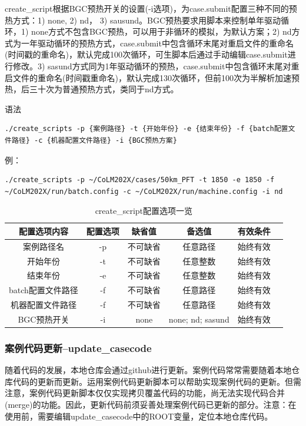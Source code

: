 \documentclass[a4paper,12pt,twoside]{article}
\begin{document}
create\_script根据BGC预热开关的设置(-i选项)，为case.submit配置三种不同的预热方式：1) none, 2) nd， 3) sausund。BGC预热要求用脚本来控制单年驱动循环，1) none方式不包含BGC预热，可以用于非循环的模拟，为默认方案；2) nd方式为一年驱动循环的预热方式，case.submit中包含循环末尾对重启文件的重命名(时间戳的重命名)，默认完成100次循环，可生脚本后通过手动编辑case.submit进行修改。3) sasund方式同为1年驱动循环的预热，case.submit中包含循环末尾对重启文件的重命名(时间戳重命名)，默认完成130次循环，但前100次为半解析加速预热，后三十次为普通预热方式，类同于nd方式。

语法
\begin{lstlisting}
./create_scripts -p {案例路径} -t {开始年份} -e {结束年份} -f {batch配置文件路径} -c {机器配置文件路径} -i {BGC预热方案}
\end{lstlisting}

例：
\begin{lstlisting}
./create_scripts -p ~/CoLM202X/cases/50km_PFT -t 1850 -e 1850 -f ~/CoLM202X/run/batch.config -c ~/CoLM202X/run/machine.config -i nd
\end{lstlisting}

\begin{table}[!htbp]
\renewcommand{\arraystretch}{1.5}
\centering 
\caption{create\_script配置选项一览}\label{tab:createscript_option}
\begin{tabular}{
cccccc} \toprule
\textbf{配置选项内容} & \textbf{配置选项} & \textbf{缺省值} & \textbf{备选值} & \textbf{有效条件}\\ \midrule
案例路径名 & -p & 不可缺省 & 任意路径 & 始终有效 \\
开始年份 & -t & 不可缺省 & 任意整数 & 始终有效\\
结束年份 & -e & 不可缺省 & 任意整数 & 始终有效\\
batch配置文件路径 & -f & 不可缺省 & 任意路径 & 始终有效 \\
机器配置文件路径 & -f & 不可缺省 & 任意路径 & 始终有效 \\
BGC预热开关 & -i &none & none; nd; sasund& 始终有效 \\
\bottomrule
\end{tabular}
\end{table}

\subsubsection{案例代码更新--update\_casecode}

随着代码的发展，本地仓库会通过github进行更新。案例代码常常需要随着本地仓库代码的更新而更新。运用案例代码更新脚本可以帮助实现案例代码的更新。但需注意，案例代码更新脚本仅仅实现拷贝覆盖代码的功能，尚无法实现代码合并(merge)的功能。因此，更新代码前须妥善处理案例代码已更新的部分。注意：在使用前，需要编辑update\_casecode中的ROOT变量，定位本地仓库代码。
\end{document}
